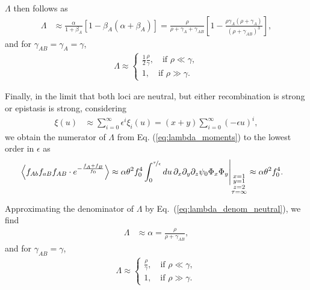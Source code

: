\documentclass[aps,rmp,twocolumn,groupedaddress,floatfix,notitlepage]{revtex4-1}
\begin{document}
$\Lambda$ then follows as
\begin{align}\label{eq:lambda_strong_s_neutral}
    \Lambda &\approx \frac{\alpha}{1+\beta_A} 
     \left[1 -  \beta_A(\alpha+\beta_A)\right] = \frac{\rho}{\rho + \gamma_A + \gamma_{AB}} \left[1 -\frac{\rho\gamma_A(\rho + \gamma_{A})}{(\rho+\gamma_{AB})^3}\right],
\end{align}
and for $\gamma_{AB} = \gamma_A = \gamma$,
\begin{align}
    \Lambda \approx
    \begin{cases}
        \frac{1}{2}\frac{\rho}{\gamma}, \quad \text{if $\rho \ll \gamma$}, \\
        1, \quad \text{if $\rho \gg \gamma.$}
    \end{cases}
\end{align}

Finally, in the limit that both loci are neutral, but either recombination is strong or epistasis is strong, considering
\begin{align}
    \xi (u) &\approx \sum_{i=0}^\infty \epsilon^i \xi_i (u) = (x+y) \sum_{i=0}^\infty \left(-\epsilon u\right)^i,
    \label{eq:f(u)_series}
\end{align}
we obtain the numerator of $\Lambda$ from Eq. (\ref{eq:lambda_moments}) to the lowest order in $\epsilon$ as 
\begin{align}\label{eq:lambda_num_large_rho}
    \left\langle f_{Ab}f_{aB}f_{AB}\cdot e^{-\frac{f_{A}+f_{B}}{f_0}}\right\rangle
 &\approx \alpha \theta^2 f_0^4 \int_0^{\nicefrac{\tau}{\epsilon}} du\, \partial_x\partial_y\partial_z \psi_0\Phi_x\Phi_y \Bigg\vert_{\substack{x=1 \\ y=1 \\ z=2 \\ \tau=\infty}} \approx \alpha \theta^2 f_0^4. 
\end{align}

Approximating the denominator of $\Lambda$ by Eq.~(\ref{eq:lambda_denom_neutral}), we find 
\begin{align}\label{eq:lambda_strong_s_neutral}
    \Lambda &\approx \alpha = \frac{\rho}{\rho + \gamma_{AB}},
\end{align}
and for $\gamma_{AB} = \gamma$,
\begin{align}
    \Lambda \approx
    \begin{cases}
        \frac{\rho}{\gamma}, \quad \text{if $\rho \ll \gamma$}, \\
        1, \quad \text{if $\rho \gg \gamma.$}
    \end{cases}
\end{align}
\end{document}
